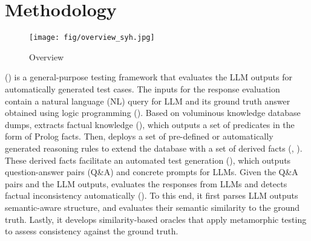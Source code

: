 


\section{Methodology}\label{sec:method}

\begin{figure}[!h]
\vspace{-2mm}
\centering
\texttt{[image: fig/overview\_syh.jpg]}
\vspace{-5mm}
\caption{\tool Overview }
\label{fig:tool_overview}
\vspace{-1mm}
\end{figure}

\tool () is a general-purpose testing framework that evaluates the LLM outputs for automatically generated test cases. 
The inputs for the response evaluation
contain a natural language (NL) query for LLM and its ground truth answer obtained using logic programming ().  
Based on voluminous knowledge database dumps, \tool extracts factual knowledge (), which outputs a set of 
predicates
in the form of Prolog facts. 
Then, \tool deploys a set of pre-defined or automatically generated reasoning rules to
extend the database with a set of derived facts (, ). 
These derived facts facilitate an automated test generation (), which outputs question-answer pairs (Q\&A) and concrete prompts for LLMs. 
Given the Q\&A pairs and the LLM outputs, \tool evaluates the responses from LLMs and detects factual inconsistency automatically (). 
To this end, it 
first parses LLM outputs semantic-aware structure, and evaluates their semantic similarity to the ground truth. %
Lastly, it develops similarity-based oracles that apply metamorphic testing to assess consistency against the ground truth. 











